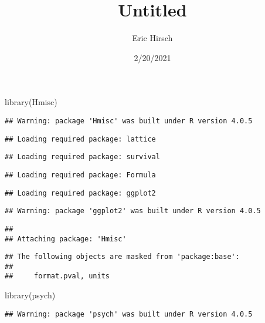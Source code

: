 \documentclass[
]{article}
\title{Untitled}
\author{Eric Hirsch}
\date{2/20/2021}
\newenvironment{Shaded}{\begin{snugshade}}{\end{snugshade}}
\newcommand{\FunctionTok}[1]{\textcolor[rgb]{0.00,0.00,0.00}{#1}}
\newcommand{\NormalTok}[1]{#1}
\begin{document}
\maketitle

\begin{Shaded}
\begin{Highlighting}[]
\FunctionTok{library}\NormalTok{(Hmisc)}
\end{Highlighting}
\end{Shaded}

\begin{verbatim}
## Warning: package 'Hmisc' was built under R version 4.0.5
\end{verbatim}

\begin{verbatim}
## Loading required package: lattice
\end{verbatim}

\begin{verbatim}
## Loading required package: survival
\end{verbatim}

\begin{verbatim}
## Loading required package: Formula
\end{verbatim}

\begin{verbatim}
## Loading required package: ggplot2
\end{verbatim}

\begin{verbatim}
## Warning: package 'ggplot2' was built under R version 4.0.5
\end{verbatim}

\begin{verbatim}
## 
## Attaching package: 'Hmisc'
\end{verbatim}

\begin{verbatim}
## The following objects are masked from 'package:base':
## 
##     format.pval, units
\end{verbatim}

\begin{Shaded}
\begin{Highlighting}[]
\FunctionTok{library}\NormalTok{(psych)}
\end{Highlighting}
\end{Shaded}

\begin{verbatim}
## Warning: package 'psych' was built under R version 4.0.5
\end{verbatim}
\end{document}
